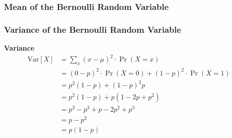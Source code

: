\documentclass[slidestop,compress,mathserif]{beamer}
\begin{document}
\begin{frame}
\frametitle{Mean of the Bernoulli Random Variable}

\vspace{0.5cm}

\end{frame}

\begin{frame}
\frametitle{Variance of the Bernoulli Random Variable}
\begin{center}
\textbf{Variance}
\begin{align*}
\mathrm{Var}[X] &= \sum_x (x - \mu)^2 \cdot \Pr(X = x) \\
    &= (0 - p)^2 \cdot \Pr(X=0) + (1 - p)^2 \cdot \Pr(X=1) \\
    &= p^2 (1-p) + (1-p)^2 p \\
    &= p^2 (1-p) + p(1 - 2p + p^2) \\
    &= p^2 - p^3 + p - 2p^2 + p^3 \\
    &= p - p^2 \\
    &= p(1-p)
\end{align*}
\end{center}
\end{frame}
\end{document}
